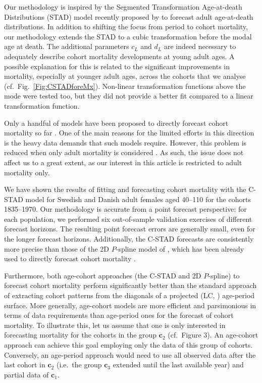\documentclass[11pt, a4paper]{article}
\begin{document}
Our methodology is inspired by the Segmented Transformation Age-at-death Distributions (STAD) model recently proposed by \cite{basellini2019modelling} to forecast adult age-at-death distributions. In addition to shifting the focus from period to cohort mortality, our methodology extends the STAD to a cubic transformation before the modal age at death. The additional parameters $c_L$ and $d_L$ are indeed necessary to adequately describe cohort mortality developments at young adult ages. A possible explanation for this is related to the significant improvements in mortality, especially at younger adult ages, across the cohorts that we analyse (cf.~Fig.~\ref{Fig:CSTADforeMx}). Non-linear transformation functions above the mode were tested too, but they did not provide a better fit compared to a linear transformation function. 

Only a handful of models have been proposed to directly forecast cohort mortality so far \citep{chiou2009modeling,zanotto2017reconstruction,rizzi2019forecasting}. One of the main reasons for the limited efforts in this direction is the heavy data demands that such models require. However, this problem is reduced when only adult mortality is considered \citep{booth2006demographic}. As such, the issue does not affect us to a great extent, as our interest in this article is restricted to adult mortality only. 

We have shown the results of fitting and forecasting cohort mortality with the C-STAD model for Swedish and Danish adult females {\color{red}aged 40--110} for the cohorts 1835--1970. Our methodology is accurate from a point forecast perspective: for each population, we performed six out-of-sample validation exercises of different forecast horizons. The resulting point forecast errors are generally small, even for the longer forecast horizons. Additionally, the C-STAD forecasts are consistently more precise than those of the 2D $P$-spline model of \cite{currie2004smoothing}, which has been already used to directly forecast cohort mortality \citep{cmi2007stochastic}. 

{\color{red} Furthermore, both age-cohort approaches (the C-STAD and 2D $P$-spline) to forecast cohort mortality perform significantly better than the standard approach of extracting cohort patterns from the diagonals of a projected \citeauthor{lee1992modeling} (LC, \citeyear{lee1992modeling}) age-period surface. More generally, age-cohort models are more efficient and parsimonious in terms of data requirements than age-period ones for the forecast of cohort mortality. To illustrate this, let us assume that one is only interested in forecasting mortality for the cohorts in the group $\bm{c}_2$ (cf.~Figure 3). An age-cohort approach can achieve this goal employing only the data of this group of cohorts. Conversely, an age-period approach would need to use all observed data after the last cohort in $\bm{c}_2$ (i.e.~the group $\bm{c}_3$ extended until the last available year) and partial data of $\bm{c}_1$. \par
}
\end{document}
